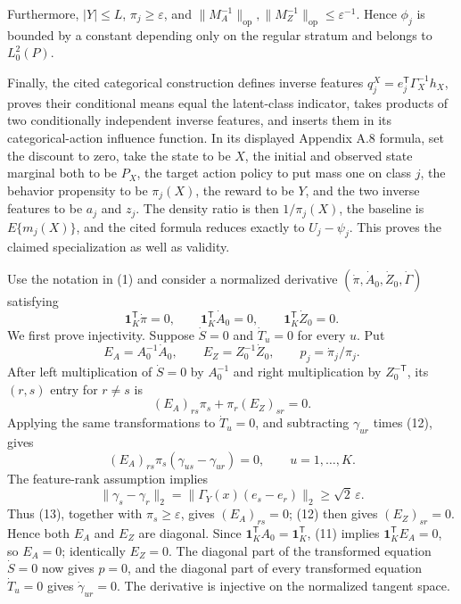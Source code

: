 Furthermore, \(|Y|\leq L\), \(\pi_j\geq\varepsilon\), and \(\|M_A^{-1}\|_{\mathrm{op}},\|M_Z^{-1}\|_{\mathrm{op}}\leq\varepsilon^{-1}\).  Hence \(\phi_j\) is bounded by a constant depending only on the regular stratum and belongs to \(L^2_0(P)\).

Finally, the cited categorical construction defines inverse features \(q_j^X=e_j^{\mathsf T}\Gamma_X^{-1}h_X\), proves their conditional means equal the latent-class indicator, takes products of two conditionally independent inverse features, and inserts them in its categorical-action influence function.  In its displayed Appendix A.8 formula, set the discount to zero, take the state to be \(X\), the initial and observed state marginal both to be \(P_X\), the target action policy to put mass one on class \(j\), the behavior propensity to be \(\pi_j(X)\), the reward to be \(Y\), and the two inverse features to be \(a_j\) and \(z_j\).  The density ratio is then \(1/\pi_j(X)\), the baseline is \(E\{m_j(X)\}\), and the cited formula reduces exactly to \(U_j-\psi_j\).  This proves the claimed specialization as well as validity.

Use the notation in (1) and consider a normalized derivative
\((\dot\pi,\dot A_0,\dot Z_0,\dot\Gamma)\) satisfying
\[
\mathbf 1_K^{\mathsf T}\dot\pi=0,\qquad
\mathbf 1_K^{\mathsf T}\dot A_0=0,\qquad
\mathbf 1_K^{\mathsf T}\dot Z_0=0. \tag{11}
\]
We first prove injectivity.  Suppose \(\dot S=0\) and \(\dot T_u=0\) for every \(u\).  Put
\[
E_A=A_0^{-1}\dot A_0,\qquad E_Z=Z_0^{-1}\dot Z_0,
\qquad p_j=\dot\pi_j/\pi_j.
\]
After left multiplication of \(\dot S=0\) by \(A_0^{-1}\) and right multiplication by \(Z_0^{-\mathsf T}\), its \((r,s)\) entry for \(r\ne s\) is
\[
(E_A)_{rs}\pi_s+\pi_r(E_Z)_{sr}=0. \tag{12}
\]
Applying the same transformations to \(\dot T_u=0\), and subtracting \(\gamma_{ur}\) times (12), gives
\[
(E_A)_{rs}\pi_s(\gamma_{us}-\gamma_{ur})=0,
\qquad u=1,\ldots,K. \tag{13}
\]
The feature-rank assumption implies
\[
\|\gamma_s-\gamma_r\|_2
=\|\Gamma_Y(x)(e_s-e_r)\|_2\geq\sqrt 2\,\varepsilon.
\]
Thus (13), together with \(\pi_s\geq\varepsilon\), gives \((E_A)_{rs}=0\); (12) then gives \((E_Z)_{sr}=0\).  Hence both \(E_A\) and \(E_Z\) are diagonal.  Since \(\mathbf 1_K^{\mathsf T}A_0=\mathbf 1_K^{\mathsf T}\), (11) implies \(\mathbf 1_K^{\mathsf T}E_A=0\), so \(E_A=0\); identically \(E_Z=0\).  The diagonal part of the transformed equation \(\dot S=0\) now gives \(p=0\), and the diagonal part of every transformed equation \(\dot T_u=0\) gives \(\dot\gamma_{ur}=0\).  The derivative is injective on the normalized tangent space.

